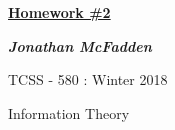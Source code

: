 \documentclass{book}[12pt]
\numberwithin{equation}{section}
\begin{document}
\begin{center}
	\begin{Huge}
		\textbf{ \underline{Homework \#2} }
	\end{Huge}
\end{center}

\vspace{0.1in}

\begin{center}
	\begin{Large}
		\textbf{\emph{Jonathan McFadden}}
	\end{Large}
\end{center}

\vspace{0.2in}

\begin{center}
	\begin{large}
		TCSS - 580  :  Winter 2018 \\
	\end{large}
	Information Theory
\end{center}


\vspace{1.75in}




\begin{flushleft}





\vspace{0.5in}

}


\vspace{0.5in}






















\end{flushleft}
\end{document}
